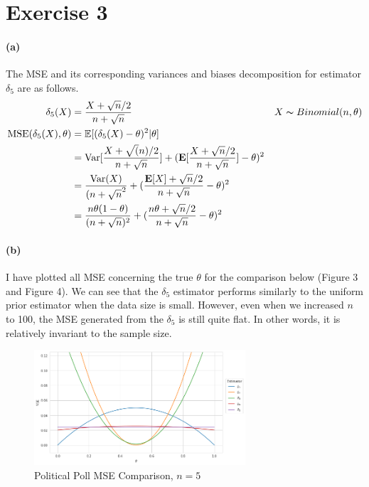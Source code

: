 \documentclass[11pt, letterpaper]{article}
\begin{document}
\section{Exercise 3}
\paragraph{(a)}
The MSE and its corresponding variances and biases decomposition for estimator $\delta_5$ are as follows.
\begin{align*}
    \delta_5(X) &= \frac{X+\sqrt{n}/2}{n + \sqrt{n}} && X \thicksim Binomial(n, \theta) \\ 
    \text{MSE}(\delta_5(X), \theta) &= \mathbb{E}[(\delta_5(X) - \theta)^2 | \theta] \\
        &= \text{Var}[\frac{X+\sqrt(n)/2}{n + \sqrt{n}}] + (\mathbf{E}[\frac{X+\sqrt{n}/2}{n + \sqrt{n}}] - \theta)^2 \\
        &= \frac{\text{Var}(X)}{(n+\sqrt{n}^2} + (\frac{\mathbf{E}[X] + \sqrt{n}/2}{n + \sqrt{n}} - \theta)^2 \\
        &= \frac{n\theta(1-\theta)}{(n+\sqrt{n})^2} + (\frac{n\theta + \sqrt{n}/2}{n+\sqrt{n}} - \theta)^2
\end{align*}

\paragraph{(b)}
I have plotted all MSE concerning the true $\theta$ for the comparison below (Figure 3 and Figure 4). We can see that the $\delta_5$ estimator performs similarly to the uniform prior estimator when the data size is small. However, even when we increased $n$ to 100, the MSE generated from the $\delta_5$ is still quite flat. In other words, it is relatively invariant to the sample size.

\begin{figure}[!h]
  \centering
  \includegraphics[width=0.7\textwidth]{3.b.png}
  \captionsetup{justification=centering}
  \caption{Political Poll MSE Comparison, $n = 5$}
\end{figure}
\end{document}
